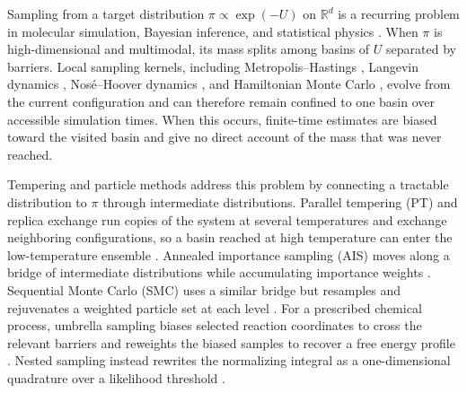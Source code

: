 \documentclass{article}
\begin{document}
Sampling from a target distribution $\pi \propto \exp(-U)$ on $\mathbb R^d$ is a recurring problem in molecular simulation, Bayesian inference, and statistical physics \citep{frenkel2002understanding,robert2004monte,landau2014guide}. When $\pi$ is high-dimensional and multimodal, its mass splits among basins of $U$ separated by barriers. Local sampling kernels, including Metropolis--Hastings \citep{metropolis1953equation,hastings1970monte}, Langevin dynamics \citep{langevin1908theorie,leimkuhler2015molecular}, Nos{\'e}--Hoover dynamics \citep{nose1984unified,hoover1985canonical}, and Hamiltonian Monte Carlo \citep{duane1987hybrid}, evolve from the current configuration and can therefore remain confined to one basin over accessible simulation times. When this occurs, finite-time estimates are biased toward the visited basin and give no direct account of the mass that was never reached.

Tempering and particle methods address this problem by connecting a tractable distribution to $\pi$ through intermediate distributions. Parallel tempering (PT) and replica exchange run copies of the system at several temperatures and exchange neighboring configurations, so a basin reached at high temperature can enter the low-temperature ensemble \citep{swendsen1986replica,geyer1991markov,hukushima1996exchange}. Annealed importance sampling (AIS) moves along a bridge of intermediate distributions while accumulating importance weights \citep{neal2001annealed}. Sequential Monte Carlo (SMC) uses a similar bridge but resamples and rejuvenates a weighted particle set at each level \citep{doucet2001introduction,delmoral2006sequential}. For a prescribed chemical process, umbrella sampling biases selected reaction coordinates to cross the relevant barriers and reweights the biased samples to recover a free energy profile \citep{torrie1977umbrella,kastner2011umbrella}. Nested sampling instead rewrites the normalizing integral as a one-dimensional quadrature over a likelihood threshold \citep{skilling2006nested}.
\end{document}

